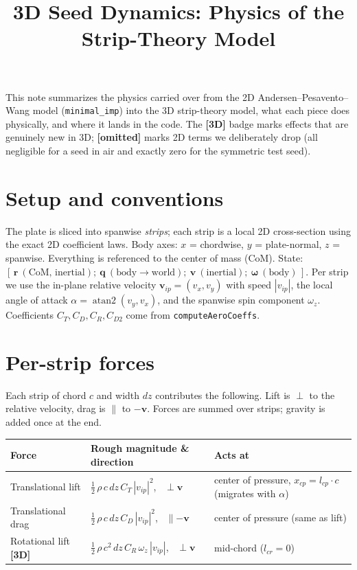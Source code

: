 \documentclass[11pt]{article}
\title{\vspace{-1.5em}3D Seed Dynamics: Physics of the Strip-Theory Model}
\author{}
\date{}
\newcommand{\newin}{{\small\textbf{\color{blue}[3D]}}}
\newcommand{\drop}{{\small\textbf{\color{red!70!black}[omitted]}}}
\begin{document}
\maketitle
\vspace{-3em}

This note summarizes the physics carried over from the 2D Andersen--Pesavento--Wang
model (\texttt{minimal\_imp}) into the 3D strip-theory model, what each piece does
physically, and where it lands in the code. The \newin{} badge marks effects that
are genuinely new in 3D; \drop{} marks 2D terms we deliberately drop (all negligible
for a seed in air and exactly zero for the symmetric test seed).

\section*{Setup and conventions}
The plate is sliced into spanwise \emph{strips}; each strip is a local 2D
cross-section using the exact 2D coefficient laws. Body axes: $x$ = chordwise,
$y$ = plate-normal, $z$ = spanwise. Everything is referenced to the center of
mass (CoM). State: $[\,\mathbf{r}\ (\text{CoM, inertial});\ \mathbf{q}\ (\text{body}\to\text{world});\ \mathbf{v}\ (\text{inertial});\ \boldsymbol{\omega}\ (\text{body})\,]$.
Per strip we use the in-plane relative velocity $\mathbf{v}_{ip}=(v_x,v_y)$ with
speed $|v_{ip}|$, the local angle of attack $\alpha=\operatorname{atan2}(v_y,v_x)$,
and the spanwise spin component $\omega_z$. Coefficients $C_T,C_D,C_R,C_{D2}$ come
from \texttt{computeAeroCoeffs}.

\section*{Per-strip forces}
Each strip of chord $c$ and width $dz$ contributes the following. Lift is
$\perp$ to the relative velocity, drag is $\parallel$ to $-\mathbf{v}$. Forces are
summed over strips; gravity is added once at the end.

\renewcommand{\arraystretch}{1.4}
\begin{tabularx}{\textwidth}{@{} l >{\raggedright\arraybackslash}p{} L @{}}
\toprule
\textbf{Force} & \textbf{Rough magnitude \& direction} & \textbf{Acts at} \\
\midrule
Translational lift &
$\tfrac12\,\rho\,c\,dz\,C_T\,|v_{ip}|^2$, \ $\perp \mathbf{v}$ &
center of pressure, $x_{cp}=l_{cp}\cdot c$ (migrates with $\alpha$) \\

Translational drag &
$\tfrac12\,\rho\,c\,dz\,C_D\,|v_{ip}|^2$, \ $\parallel -\mathbf{v}$ &
center of pressure (same as lift) \\

Rotational lift \newin{} &
$\tfrac12\,\rho\,c^2\,dz\,C_R\,\omega_z\,|v_{ip}|$, \ $\perp \mathbf{v}$ &
mid-chord ($l_{cr}=0$) \\
\bottomrule
\end{tabularx}
\end{document}

